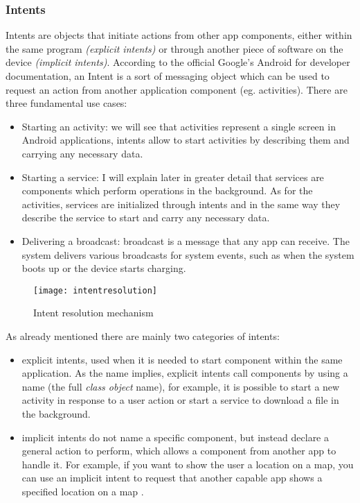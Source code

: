 \subsubsection{Intents}\label{intents} Intents are objects that initiate actions from other app components, either within the same program \textit{(explicit intents)} or through another piece of software on the device \textit{(implicit intents)}.
According to the official Google's Android for developer documentation, an Intent is a sort of messaging object which can be used to request an action from another application component (eg. activities). There are three fundamental use cases:
\begin{itemize}
	\item Starting an activity: we will see that activities represent a single screen in Android applications, intents allow to start activities by describing them and carrying any necessary data.
	\item Starting a service: I will explain later in greater detail that services are components which perform operations in the background. As for the activities, services are initialized through intents and in the same way they describe the service to start and carry any necessary data.
	\item Delivering a broadcast: broadcast is a message that any app can receive. The system delivers various broadcasts for system events, such as when the system boots up or the device starts charging.
\end{itemize}
\begin{figure}[h!]
	\centering
	\texttt{[image: intentresolution]}
	\caption{Intent resolution mechanism}
	\label{fig:2.4}
\end{figure}
As already mentioned there are mainly two categories of intents:
\begin{itemize}
	\item explicit intents, used when it is needed to start component within the same application. As the name implies, explicit intents call components by using a name (the full \textit{class object} name), for example, it is possible to start a new activity in response to a user action or start a service to download a file in the background.
	\item implicit intents do not name a specific component, but instead declare a general action to perform, which allows a component from another app to handle it. For example, if you want to show the user a location on a map, you can use an implicit intent to request that another capable app shows a specified location on a map \cite{devandroidintent}.
\end{itemize}
